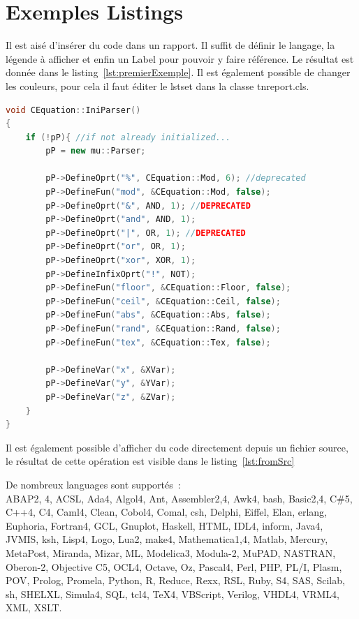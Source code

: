 \documentclass{tnreport}
\begin{document}
\cleardoublepage{}

\chapter{Exemples Listings}

Il est aisé d'insérer du code dans un rapport. Il suffit de définir le langage,
la légende à afficher et enfin un Label pour pouvoir y faire référence. Le
résultat est donnée dans le listing~\ref{lst:premierExemple}. Il est également
possible de changer les couleurs, pour cela il faut éditer le lstset dans la
classe tnreport.cls.

\begin{lstlisting}[language=c++, caption={Premier Exemple}, label={lst:premierExemple}]
void CEquation::IniParser()
{
	if (!pP){ //if not already initialized...
		pP = new mu::Parser;

		pP->DefineOprt("%", CEquation::Mod, 6); //deprecated
		pP->DefineFun("mod", &CEquation::Mod, false);
		pP->DefineOprt("&", AND, 1); //DEPRECATED
		pP->DefineOprt("and", AND, 1);
		pP->DefineOprt("|", OR, 1); //DEPRECATED
		pP->DefineOprt("or", OR, 1);
		pP->DefineOprt("xor", XOR, 1);
		pP->DefineInfixOprt("!", NOT);
		pP->DefineFun("floor", &CEquation::Floor, false);
		pP->DefineFun("ceil", &CEquation::Ceil, false);
		pP->DefineFun("abs", &CEquation::Abs, false);
		pP->DefineFun("rand", &CEquation::Rand, false);
		pP->DefineFun("tex", &CEquation::Tex, false);

		pP->DefineVar("x", &XVar);
		pP->DefineVar("y", &YVar);
		pP->DefineVar("z", &ZVar);
	}
}
\end{lstlisting}
\clearpage
Il est également possible d'afficher du code directement depuis un fichier source, le résultat de cette opération est visible dans le listing~\ref{lst:fromSrc}


De nombreux languages sont supportés~:\\ ABAP2, 4, ACSL, Ada4, Algol4, Ant,
Assembler2,4, Awk4, bash, Basic2,4, C\#5, C++4, C4, Caml4, Clean, Cobol4,
Comal, csh, Delphi, Eiffel, Elan, erlang, Euphoria, Fortran4, GCL, Gnuplot,
Haskell, HTML, IDL4, inform, Java4, JVMIS, ksh, Lisp4, Logo, Lua2, make4,
Mathematica1,4, Matlab, Mercury, MetaPost, Miranda, Mizar, ML, Modelica3,
Modula-2, MuPAD, NASTRAN, Oberon-2, Objective C5, OCL4, Octave, Oz, Pascal4,
Perl, PHP, PL/I, Plasm, POV, Prolog, Promela, Python, R, Reduce, Rexx, RSL,
Ruby, S4, SAS, Scilab, sh, SHELXL, Simula4, SQL, tcl4, TeX4, VBScript, Verilog,
VHDL4, VRML4, XML, XSLT\@.
\end{document}
